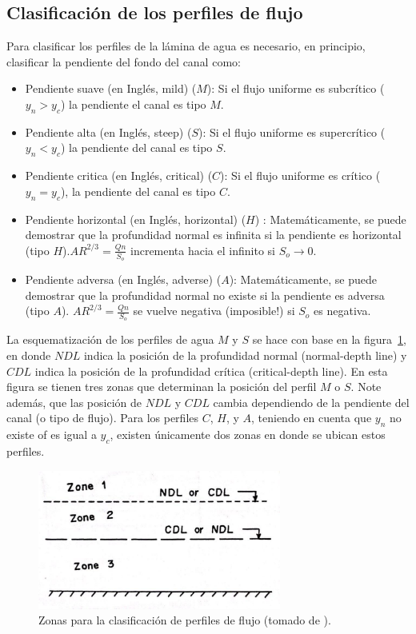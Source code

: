 \documentclass[11pt, oneside]{article}
\begin{document}
\subsection{Clasificaci\'on de los perfiles de flujo}
Para clasificar los perfiles de la l\'amina de agua es necesario, en principio, clasificar la pendiente del fondo del canal como:
\begin{itemize}
    \item Pendiente suave (en Ingl\'es, mild) ($M$): Si el flujo uniforme es subcr\'itico ($y_n > y_c$) la pendiente el canal es tipo $M$.
    \item Pendiente alta (en Ingl\'es, steep) ($S$): Si el flujo uniforme es supercr\'itico ($y_n < y_c$) la pendiente del canal es tipo $S$.
    \item Pendiente critica (en Ingl\'es, critical) ($C$): Si el flujo uniforme es cr\'itico ($y_n = y_c$), la pendiente del canal es tipo $C$.
    \item Pendiente horizontal (en Ingl\'es, horizontal) ($H$) : Matem\'aticamente, se puede demostrar que la profundidad normal es infinita si la pendiente es horizontal (tipo $H$).$A R ^{2/3} = \frac{Q n}{S_o}$ incrementa hacia el infinito si $S_o \rightarrow 0$. 
    \item Pendiente adversa (en Ingl\'es, adverse) ($A$): Matem\'aticamente, se puede demostrar que la profundidad normal no existe si la pendiente es adversa (tipo $A$). $A R ^{2/3} = \frac{Q n}{S_o}$ se vuelve negativa (imposible!) si $S_o$ es negativa.
\end{itemize}

La esquematizaci\'on de los perfiles de agua $M$ y $S$ se hace con base en la figura~\ref{fig2}, en donde $NDL$ indica la posici\'on de la profundidad normal (normal-depth line) y $CDL$ indica la posici\'on de la profundidad cr\'itica (critical-depth line). En esta figura se tienen tres zonas que determinan la posici\'on del perfil $M$ o $S$. Note adem\'as, que las posici\'on de $NDL$ y $CDL$ cambia dependiendo de la pendiente del canal (o tipo de flujo). Para los perfiles $C$, $H$, y $A$, teniendo en cuenta que $y_n$ no existe of es igual a $y_c$, existen \'unicamente dos zonas en donde se ubican estos perfiles. 

\begin{figure}[h]
\centering
\includegraphics[width=8cm]{fig52.jpeg}
\caption{Zonas para la clasificaci\'on de perfiles de flujo (tomado de \cite{Chau}).}
\label{fig2}
\end{figure}
\end{document}
